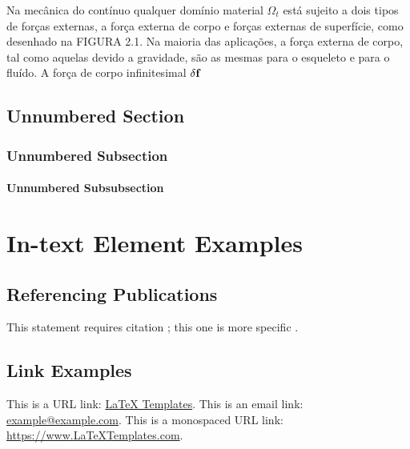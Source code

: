 \documentclass[
	11pt, %
	fleqn, %
	a4paper, %
]{LegrandOrangeBook}
\begin{document}
Na mecânica do contínuo qualquer domínio material $\Omega_t$ está sujeito a dois tipos de forças externas, a força externa de corpo e forças externas de superfície, como desenhado na FIGURA 2.1. Na maioria das aplicações, a força externa de corpo, tal como aquelas devido a gravidade, são as mesmas para o esqueleto e para o fluído. A força de corpo infinitesimal $\delta \textbf{f}$



\newpage


\section*{Unnumbered Section}

\subsection*{Unnumbered Subsection}

\subsubsection*{Unnumbered Subsubsection}


\chapter{In-text Element Examples}

\section{Referencing Publications}

This statement requires citation \cite{Smith:2022jd}; this one is more specific \cite[162]{Smith:2021qr}.


\section{Link Examples}

This is a URL link: \href{https://www.latextemplates.com}{LaTeX Templates}. This is an email link: \href{mailto:example@example.com}{example@example.com}. This is a monospaced URL link: \url{https://www.LaTeXTemplates.com}.
\end{document}
